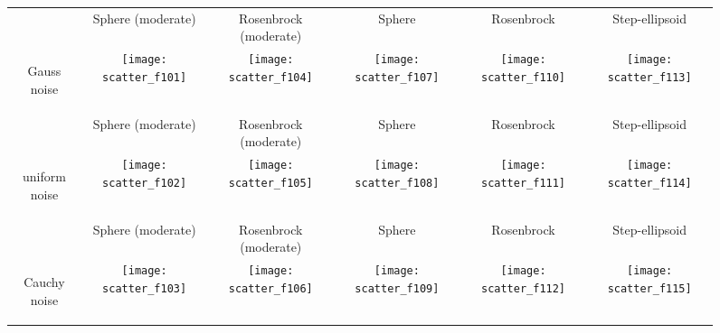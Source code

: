 \documentclass{sig-alternate}
\begin{document}
\begin{figure*}
\small
\centering
\begin{tabular}{@{}c@{}*{5}{@{}c@{}}}
 & { Sphere (moderate)} & { Rosenbrock (moderate)} & { Sphere} & { Rosenbrock} & { Step-ellipsoid} \\
\begin{turn}{90}\parbox{0.175\textwidth}{\centering\sf Gauss noise}\end{turn} &
    \texttt{[image: scatter\_f101]}&
    \texttt{[image: scatter\_f104]}&
    \texttt{[image: scatter\_f107]}&
    \texttt{[image: scatter\_f110]}&
    \texttt{[image: scatter\_f113]}\\
 & { Sphere (moderate)} & { Rosenbrock (moderate)} & { Sphere} & { Rosenbrock} & { Step-ellipsoid}\\
\begin{turn}{90}\parbox{0.175\textwidth}{\centering\sf uniform noise}\end{turn} &
    \texttt{[image: scatter\_f102]}&
    \texttt{[image: scatter\_f105]}&
    \texttt{[image: scatter\_f108]}&
    \texttt{[image: scatter\_f111]}&
    \texttt{[image: scatter\_f114]}\\
 & { Sphere (moderate)} & { Rosenbrock (moderate)} & { Sphere} & { Rosenbrock} & { Step-ellipsoid}\\
\begin{turn}{90}\parbox{0.175\textwidth}{\centering\sf Cauchy noise}\end{turn} &
    \texttt{[image: scatter\_f103]}&
    \texttt{[image: scatter\_f106]}&
    \texttt{[image: scatter\_f109]}&
    \texttt{[image: scatter\_f112]}&
    \texttt{[image: scatter\_f115]}\\\hline

\end{tabular}
\end{figure*}
\end{document}
